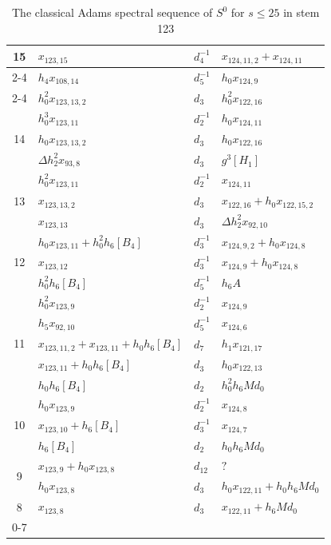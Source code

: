 \begin{table}[htbp]
{\begin{tabular}{|c|l|l|l|}
\multirow{3}{*}{15} & $x_{123,15}$ & $d_{4}^{-1}$ & $x_{124,11,2}+x_{124,11}$ \\\cline{2-4}
 & $h_4x_{108,14}$ & $d_{5}^{-1}$ & $h_0x_{124,9}$ \\\cline{2-4}
 & $h_0^2x_{123,13,2}$ & $d_{3}$ & $h_0^2x_{122,16}$ \\\hline\hline
\multirow{3}{*}{14} & $h_0^3x_{123,11}$ & $d_{2}^{-1}$ & $h_0x_{124,11}$ \\\cline{2-4}
 & $h_0x_{123,13,2}$ & $d_{3}$ & $h_0x_{122,16}$ \\\cline{2-4}
 & $\Delta h_2^2x_{93,8}$ & $d_{3}$ & $g^3[H_1]$ \\\hline\hline
\multirow{3}{*}{13} & $h_0^2x_{123,11}$ & $d_{2}^{-1}$ & $x_{124,11}$ \\\cline{2-4}
 & $x_{123,13,2}$ & $d_{3}$ & $x_{122,16}+h_0x_{122,15,2}$ \\\cline{2-4}
 & $x_{123,13}$ & $d_{3}$ & $\Delta h_2^2x_{92,10}$ \\\hline\hline
\multirow{3}{*}{12} & $h_0x_{123,11}+h_0^2h_6[B_4]$ & $d_{3}^{-1}$ & $x_{124,9,2}+h_0x_{124,8}$ \\\cline{2-4}
 & $x_{123,12}$ & $d_{3}^{-1}$ & $x_{124,9}+h_0x_{124,8}$ \\\cline{2-4}
 & $h_0^2h_6[B_4]$ & $d_{5}^{-1}$ & $h_6A$ \\\hline\hline
\multirow{5}{*}{11} & $h_0^2x_{123,9}$ & $d_{2}^{-1}$ & $x_{124,9}$ \\\cline{2-4}
 & $h_5x_{92,10}$ & $d_{5}^{-1}$ & $x_{124,6}$ \\\cline{2-4}
 & $x_{123,11,2}+x_{123,11}+h_0h_6[B_4]$ & $d_{7}$ & $h_1x_{121,17}$ \\\cline{2-4}
 & $x_{123,11}+h_0h_6[B_4]$ & $d_{3}$ & $h_0x_{122,13}$ \\\cline{2-4}
 & $h_0h_6[B_4]$ & $d_{2}$ & $h_0^2h_6Md_0$ \\\hline\hline
\multirow{3}{*}{10} & $h_0x_{123,9}$ & $d_{2}^{-1}$ & $x_{124,8}$ \\\cline{2-4}
 & $x_{123,10}+h_6[B_4]$ & $d_{3}^{-1}$ & $x_{124,7}$ \\\cline{2-4}
 & $h_6[B_4]$ & $d_{2}$ & $h_0h_6Md_0$ \\\hline\hline
\multirow{2}{*}{9} & $x_{123,9}+h_0x_{123,8}$ & $d_{12}$ & $?$ \\\cline{2-4}
 & $h_0x_{123,8}$ & $d_{3}$ & $h_0x_{122,11}+h_0h_6Md_0$ \\\hline\hline
\multirow{1}{*}{8} & $x_{123,8}$ & $d_{3}$ & $x_{122,11}+h_6Md_0$ \\\hline\hline
\multirow{1}{*}{0-7} & \multicolumn{3}{c|}{}\\\hline
\end{tabular}}
\caption{The classical Adams spectral sequence of $S^0$ for $s \le 25$ in stem 123}
\label{Table:S123}
\end{table}



